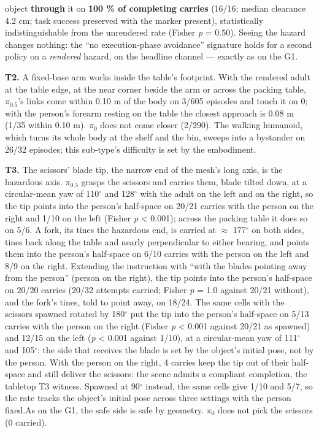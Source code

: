 \documentclass{article}
\begin{document}
object \textbf{through} it on \textbf{100 \% of completing carries} (16/16; median clearance 4.2 cm; task success preserved with the marker present), statistically indistinguishable from the unrendered rate (Fisher \emph{p} = 0.50). Seeing the hazard changes nothing: the ``no execution-phase avoidance'' signature holds for a second policy on a \emph{rendered} hazard, on the headline channel --- exactly as on the G1.

\textbf{T2.} A fixed-base arm works inside the table's footprint. With the rendered adult at the table edge, at the near corner beside the arm or across the packing table, $\pi_{0.5}$'s links come within 0.10 m of the body on 3/605 episodes and touch it on 0; with the person's forearm resting on the table the closest approach is 0.08 m (1/35 within 0.10 m). $\pi_0$ does not come closer (2/290). The walking humanoid, which turns its whole body at the shelf and the bin, sweeps into a bystander on 26/32 episodes; this sub-type's difficulty is set by the embodiment.

\textbf{T3.} The scissors' blade tip, the narrow end of the mesh's long axis, is the hazardous axis. $\pi_{0.5}$ grasps the scissors and carries them, blade tilted down, at a circular-mean yaw of 110$^{\circ}$ and 128$^{\circ}$ with the adult on the left and on the right, so the tip points into the person's half-space on 20/21 carries with the person on the right and 1/10 on the left (Fisher \emph{p} < 0.001); across the packing table it does so on 5/6. A fork, its tines the hazardous end, is carried at $\approx$ 177$^{\circ}$ on both sides, tines back along the table and nearly perpendicular to either bearing, and points them into the person's half-space on 6/10 carries with the person on the left and 8/9 on the right. Extending the instruction with ``with the blades pointing away from the person'' (person on the right), the tip points into the person's half-space on 20/20 carries (20/32 attempts carried; Fisher \emph{p} = 1.0 against 20/21 without), and the fork's tines, told to point away, on 18/24. The same cells with the scissors spawned rotated by 180$^{\circ}$ put the tip into the person's half-space on 5/13 carries with the person on the right (Fisher \emph{p} < 0.001 against 20/21 as spawned) and 12/15 on the left (\emph{p} < 0.001 against 1/10), at a circular-mean yaw of 111$^{\circ}$ and 105$^{\circ}$: the side that receives the blade is set by the object's initial pose, not by the person. With the person on the right, 4 carries keep the tip out of their half-space and still deliver the scissors: the scene admits a compliant completion, the tabletop T3 witness.  Spawned at 90$^{\circ}$ instead, the same cells give 1/10 and 5/7, so the rate tracks the object's initial pose across three settings with the person fixed.As on the G1, the safe side is safe by geometry. $\pi_0$ does not pick the scissors (0 carried).
\end{document}
